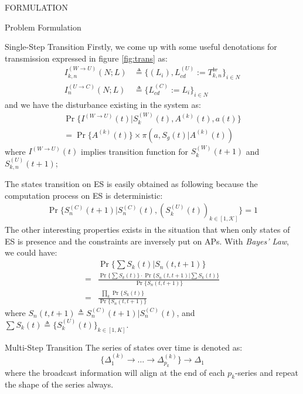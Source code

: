 \documentclass[10pt, conference, letterpaper]{IEEEtran}
\begin{document}
\begin{section}{FORMULATION}
\begin{subsection}{Problem Formulation}
\begin{subsubsection}{Single-Step Transition}
                Firstly, we come up with some useful denotations for transmission expressed in figure \ref{fig:trans} as:
                \begin{align*}
                    I^{(W \to U)}_{k,n}(N;L) &\triangleq \{ (L_i),L^{(U)}_{cd}:=T^{br}_{k,n} \}_{i \in N}
                        \\
                    I^{(U \to C)}_{n}(N;L) &\triangleq \{ L^{(C)}_{cd}:=L_i \}_{i \in N}
                \end{align*}
                and we have the disturbance existing in the system as:
                \begin{gather*}
                    \Pr\{ I^{(W \to U)}(t) | S_{k}^{(W)}(t),A^{(k)}(t), a(t) \}
                    \\
                        = \Pr\{ A^{(k)}(t) \} \times \pi(a, S_g(t)|A^{(k)}(t))
                \end{gather*}
                where $I^{(W \to U)}(t)$ implies transition function for $S^{(W)}_{k}(t+1)$ and $S^{(U)}_{k,n}(t+1)$;

                The states transition on ES is easily obtained as following because the computation process on ES is deterministic:
                \begin{gather}
                    \Pr\{ S_{n}^{(C)}(t+1) |S_{n}^{(C)}(t), (S_{k}^{(U)}(t))_{k \in [1,\mathcal{K}]} \} = 1
                \end{gather}
                The other interesting properties exists in the situation that when only states of ES is presence and the constraints are inversely put on APs. With \emph{Bayes' Law}, we could have:
                \begin{align}
                    & \Pr\{ \sum{S_k(t)} | S_n(t,t+1) \} \nonumber\\
                    =& \frac{ \Pr\{\sum{S_k(t)}\} \cdot \Pr\{S_n(t,t+1)|\sum{S_k(t)}\} }{ \Pr\{S_n(t,t+1)\} } \nonumber\\
                    =& \frac{
                            \prod_k \Pr\{S_k(t)\}
                        }{
                            \Pr\{S_n(t,t+1)\}
                        }
                \end{align}
                where $S_n(t,t+1) \triangleq S_{n}^{(C)}(t+1) |S_{n}^{(C)}(t)$, and $\sum{S_k(t)} \triangleq \{S_{k}^{(U)}(t)\}_{k \in [1,K]}$.
            \end{subsubsection}

            \begin{subsubsection}{Multi-Step Transition}
                The series of states over time is denoted as:
                $$
                \{ \Delta^{(k)}_1 \to \dots \to \Delta^{(k)}_{p_k} \} \to \Delta_{1}
                $$
                where the broadcast information will align at the end of each $p_k$-series and repeat the shape of the series always.
                

\end{subsubsection}
\end{subsection}
\end{section}
\end{document}
